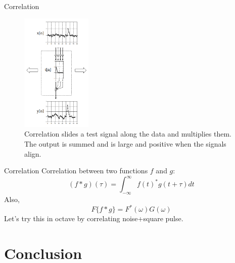 \documentclass{beamer}
\begin{document}
\begin{frame}{Correlation}
\small
\begin{figure}
\centering
\includegraphics[width=0.3\textwidth]{figures/corr.png}
\caption{\label{fig:corr} Correlation slides a test signal along the data and multiplies them.  The output is summed and is large and positive when the signals align.}
\end{figure}
\end{frame}

\begin{frame}{Correlation}
Correlation between two functions $f$ and $g$:
\begin{equation}
(f * g)(\tau) = \int_{-\infty}^{\infty} f(t)^* g(t+\tau) dt
\end{equation}
Also,
\begin{equation}
F\lbrace f * g \rbrace = F^*(\omega) G(\omega)
\end{equation}
Let's try this in octave by correlating noise+square pulse.
\end{frame}

\section{Conclusion}
\end{document}
